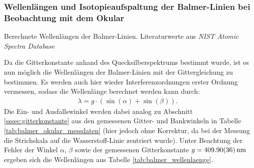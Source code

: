 \documentclass[11pt, a4paper]{article}
\numberwithin{equation}{section}
\begin{document}
\subsubsection{Wellenlängen und Isotopieaufspaltung der Balmer-Linien bei Beobachtung mit dem Okular}
\begin{table}[h]
	\centering
	
	\caption{Berechnete Wellenlängen der Balmer-Linien. Literaturwerte aus \emph{NIST Atomic Spectra Database} \cite{NISTSpectra}}
	\label{tab:balmer_wellenlaenge}
\end{table}
Da die Gitterkonstante anhand des Quecksilberspektrums bestimmt wurde, ist es nun möglich die Wellenlängen der Balmer-Linien mit der Gittergleichung zu bestimmen.
Es werden auch hier wieder Interferenzordnungen erster Ordnung vermessen, sodass die Wellenlänge berechnet werden kann durch:
\begin{align*}
  \lambda = g \cdot ( \sin(\alpha) + \sin(\beta)) \text{.}
\end{align*}
Die Ein- und Ausfallswinkel werden dabei analog zu Abschnitt \ref{sssec:gitterkonstante} aus den gemessenen Gitter- und Bankwinkeln in Tabelle \ref{tab:balmer_okular_messdaten} (hier jedoch ohne Korrektur, da bei der Messung die Strichskala auf die Wasserstoff-Linie zentriert wurde).
Unter Beachtung der Fehler der Winkel $\alpha$, $\beta$ sowie der gemessenen Gitterkonstante $g = \SI{409.90 +- 0.36}{\nano\metre}$ ergeben sich die Wellenlängen aus Tabelle \ref{tab:balmer_wellenlaenge}.
\end{document}
